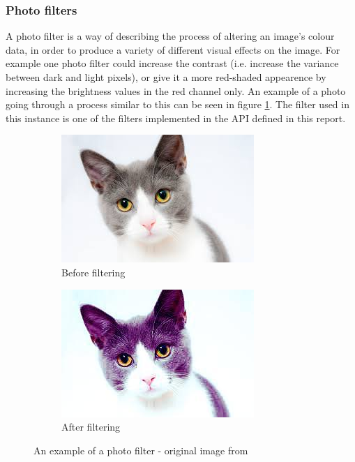 \documentclass[a4paper,12pt]{report}
\begin{document}
     \subsubsection{Photo filters}
       A photo filter is a way of describing the process of altering an image's colour data, in order to produce a variety of different visual effects on the image. For example one photo filter could increase the contrast (i.e. increase the variance between dark and light pixels), or give it a more red-shaded appearence by increasing the brightness values in the red channel only. An example of a photo going through a process similar to this can be seen in figure \ref{fig:cat-filter}. The filter used in this instance is one of the filters implemented in the API defined in this report.

       \begin{figure}[H]
         \centering
         \begin{subfigure}[b]{0.4\textwidth}
           \centering
           \includegraphics[width=0.8\linewidth]{cat-unfiltered}
           \caption{Before filtering}
         \end{subfigure}
         \begin{subfigure}[b]{0.4\textwidth}
           \centering
           \includegraphics[width=0.8\linewidth]{cat-filtered}
           \caption{After filtering}
         \end{subfigure}
         \caption[An example of a photo filter]{An example of a photo filter - original image from \protect\cite{cat2013image}}
         \label{fig:cat-filter}
       \end{figure}
\end{document}
